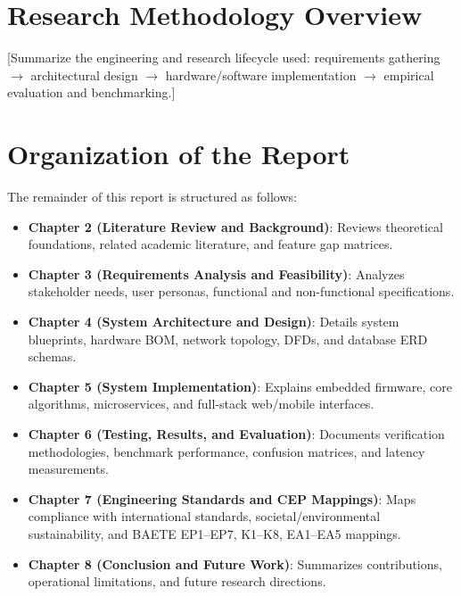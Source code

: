 \section{Research Methodology Overview}
[Summarize the engineering and research lifecycle used: requirements gathering $\rightarrow$ architectural design $\rightarrow$ hardware/software implementation $\rightarrow$ empirical evaluation and benchmarking.]

\section{Organization of the Report}
The remainder of this report is structured as follows:
\begin{itemize}
    \item \textbf{Chapter 2 (Literature Review and Background)}: Reviews theoretical foundations, related academic literature, and feature gap matrices.
    \item \textbf{Chapter 3 (Requirements Analysis and Feasibility)}: Analyzes stakeholder needs, user personas, functional and non-functional specifications.
    \item \textbf{Chapter 4 (System Architecture and Design)}: Details system blueprints, hardware BOM, network topology, DFDs, and database ERD schemas.
    \item \textbf{Chapter 5 (System Implementation)}: Explains embedded firmware, core algorithms, microservices, and full-stack web/mobile interfaces.
    \item \textbf{Chapter 6 (Testing, Results, and Evaluation)}: Documents verification methodologies, benchmark performance, confusion matrices, and latency measurements.
    \item \textbf{Chapter 7 (Engineering Standards and CEP Mappings)}: Maps compliance with international standards, societal/environmental sustainability, and BAETE EP1--EP7, K1--K8, EA1--EA5 mappings.
    \item \textbf{Chapter 8 (Conclusion and Future Work)}: Summarizes contributions, operational limitations, and future research directions.
\end{itemize}
